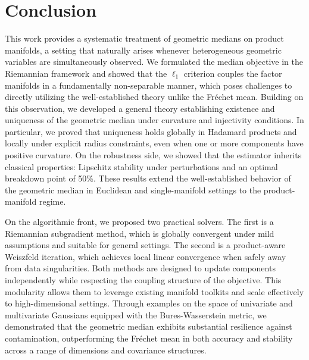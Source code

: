 \documentclass[10pt]{article}
\newcommand{\Frechet}{Fr\'{e}chet\xspace}
\begin{document}
\section{Conclusion}\label{sec:conclusion}

This work provides a systematic treatment of geometric medians on product manifolds, a setting that naturally arises whenever heterogeneous geometric variables are simultaneously observed. We formulated the median objective in the Riemannian framework and showed that the $\ell_1$ criterion couples the factor manifolds in a fundamentally non-separable manner, which poses challenges to directly utilizing the well-established theory unlike the \Frechet mean. Building on this observation, we developed a general theory establishing existence and uniqueness of the geometric median under curvature and injectivity conditions. In particular, we proved that uniqueness holds globally in Hadamard products and locally under explicit radius constraints, even when one or more components have positive curvature. On the robustness side, we showed that the estimator inherits classical properties: Lipschitz stability under perturbations and an optimal breakdown point of 50\%. These results extend the well-established behavior of the geometric median in Euclidean and single-manifold settings to the product-manifold regime.

On the algorithmic front, we proposed two practical solvers. The first is a Riemannian subgradient method, which is globally convergent under mild assumptions and suitable for general settings. The second is a product-aware Weiszfeld iteration, which achieves local linear convergence when safely away from data singularities. Both methods are designed to update components independently while respecting the coupling structure of the objective. This modularity allows them to leverage existing manifold toolkits and scale effectively to high-dimensional settings. Through examples on the space of univariate and multivariate Gaussians equipped with the Bures-Wasserstein metric, we demonstrated that the geometric median exhibits substantial resilience against contamination, outperforming the \Frechet mean in both accuracy and stability across a range of dimensions and covariance structures.
\end{document}
